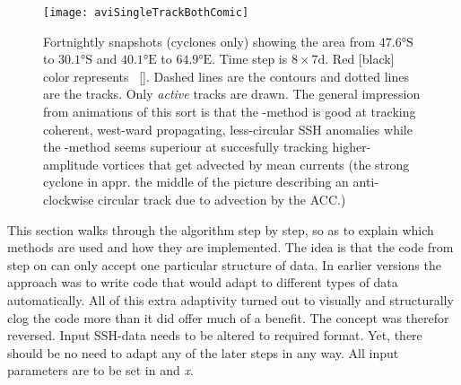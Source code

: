 \label{chap:algorithm}

\begin{fullwidth}
\begin{figure*}
\texttt{[image: aviSingleTrackBothComic]}
\caption
{
Fortnightly \aviII snapshots (cyclones only) showing the area from $\ang{47.6} \mathrm{S}$ to $\ang{30.1} \mathrm{S}$ and $\ang{40.1} \mathrm{E}$ to $\ang{64.9} \mathrm{E}$. Time step is $8\times 7 \si{\day}$. Red [black] color represents \MI~[\MII]. Dashed lines are the contours and dotted lines are the tracks. Only \textit{active} tracks are drawn. The general impression from animations of this sort is that the \MI-method is good at tracking coherent, west-ward propagating, less-circular SSH anomalies while the \MII-method seems superiour at succesfully tracking higher-amplitude vortices that get advected by mean currents (\eg the strong cyclone in appr. the middle of the picture describing an anti-clockwise circular track due to advection by the ACC.)
}
\label{fig:aviSingleTrackBothComic}
\end{figure*}
\end{fullwidth}




This section walks through the algorithm step by step, so as to explain
which
methods are used and how they are implemented.
The idea is that the code from step  on can only accept one particular structure of data. In earlier versions the approach was to write code
that would adapt to different types of data automatically. All of this extra
adaptivity turned out to visually and structurally clog the code more than it
did offer much of a benefit. The concept was therefor reversed. Input SSH-data needs to be altered to required format. Yet, there should be no need to adapt any of the later steps in any way.
All input parameters are to be set in  and \textit{x}.

